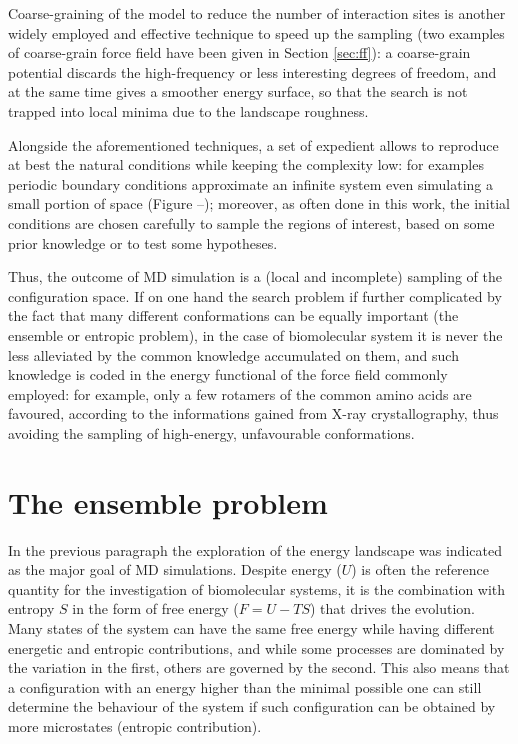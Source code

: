 Coarse-graining of the model to reduce the number of interaction sites \cite{54,55,56,57,58,59} is another widely employed and effective technique to speed up the sampling (two examples of coarse-grain force field have been given in Section \ref{sec:ff}): a coarse-grain potential discards the high-frequency or less interesting degrees of freedom, and at the same time gives a smoother energy surface, so that the search is not trapped into local minima due to the landscape roughness.

Alongside the aforementioned techniques, a set of expedient allows to reproduce at best the natural conditions while keeping the complexity low:
%
for examples periodic boundary conditions \cite{hh} approximate an infinite system even simulating a small portion of space (Figure --); moreover, as often done in this work, the initial conditions are chosen carefully to sample the regions of interest, based on some prior knowledge or to test some hypotheses.

Thus, the outcome of MD simulation is a (local and incomplete) sampling of the configuration space.
%
If on one hand the search problem if further complicated by the fact that many different conformations can be equally important (the ensemble or entropic problem), in the case of biomolecular system it is never the less alleviated by the common knowledge accumulated on them, and such knowledge is coded in the energy functional of the force field commonly employed: for example, only a few rotamers of the common amino acids are favoured, according to the informations gained from X-ray crystallography, thus avoiding the sampling of high-energy, unfavourable conformations.


\section{The ensemble problem}

In the previous paragraph the exploration of the energy landscape was indicated as the major goal of MD simulations. Despite energy ($U$) is often the reference quantity for the investigation of biomolecular systems, it is the combination with entropy $S$ in the form of free energy ($F = U - TS$) that drives the evolution. Many states of the system can have the same free energy while having different energetic and entropic contributions, and while some processes are dominated by the variation in the first, others are governed by the second.
%
This also means that a configuration with an energy higher than the minimal possible one can still determine the behaviour of the system if such configuration can be obtained by more microstates (entropic contribution).

